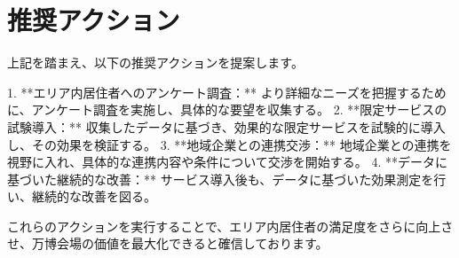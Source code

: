 \documentclass[11pt,a4paper]{article}
\begin{document}
\section*{推奨アクション}

上記を踏まえ、以下の推奨アクションを提案します。

1.  **エリア内居住者へのアンケート調査：** より詳細なニーズを把握するために、アンケート調査を実施し、具体的な要望を収集する。
2.  **限定サービスの試験導入：** 収集したデータに基づき、効果的な限定サービスを試験的に導入し、その効果を検証する。
3.  **地域企業との連携交渉：** 地域企業との連携を視野に入れ、具体的な連携内容や条件について交渉を開始する。
4.  **データに基づいた継続的な改善：** サービス導入後も、データに基づいた効果測定を行い、継続的な改善を図る。

これらのアクションを実行することで、エリア内居住者の満足度をさらに向上させ、万博会場の価値を最大化できると確信しております。
\end{document}
